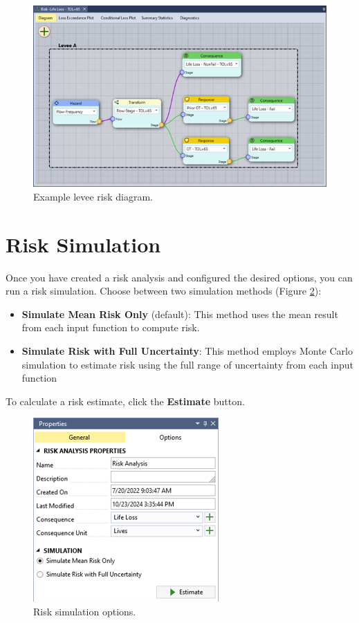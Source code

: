 \documentclass[
]{book}
\begin{document}
\begin{figure}

{\centering \includegraphics{images/figure135} 

}

\caption{Example levee risk diagram.}\label{fig:figure-135}
\end{figure}

\hypertarget{risk-simulation}{%
\section{Risk Simulation}\label{risk-simulation}}

Once you have created a risk analysis and configured the desired options, you can run a risk simulation. Choose between two simulation methods (Figure \ref{fig:figure-riskprop}):

\begin{itemize}
\item
  \textbf{Simulate Mean Risk Only} (default): This method uses the mean result from each input function to compute risk.
\item
  \textbf{Simulate Risk with Full Uncertainty}: This method employs Monte Carlo simulation to estimate risk using the full range of uncertainty from each input function
\end{itemize}

To calculate a risk estimate, click the \textbf{Estimate} button.

\begin{figure}

{\centering \includegraphics{images/riskproperties} 

}

\caption{Risk simulation options.}\label{fig:figure-riskprop}
\end{figure}
\end{document}
